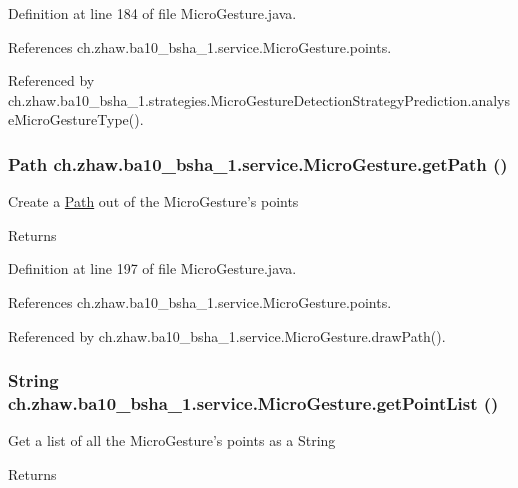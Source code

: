 Definition at line 184 of file MicroGesture.java.

References ch.zhaw.ba10\_\-bsha\_\-1.service.MicroGesture.points.

Referenced by ch.zhaw.ba10\_\-bsha\_\-1.strategies.MicroGestureDetectionStrategyPrediction.analyseMicroGestureType().\hypertarget{classch_1_1zhaw_1_1ba10__bsha__1_1_1service_1_1MicroGesture_a9640a018716e9a2ff309360071af6be7}{
\subsubsection[{getPath}]{\setlength{\rightskip}{0pt plus 5cm}Path ch.zhaw.ba10\_\-bsha\_\-1.service.MicroGesture.getPath ()}}
\label{classch_1_1zhaw_1_1ba10__bsha__1_1_1service_1_1MicroGesture_a9640a018716e9a2ff309360071af6be7}
Create a \hyperlink{}{Path} out of the MicroGesture's points

\begin{DoxyReturn}{Returns}

\end{DoxyReturn}


Definition at line 197 of file MicroGesture.java.

References ch.zhaw.ba10\_\-bsha\_\-1.service.MicroGesture.points.

Referenced by ch.zhaw.ba10\_\-bsha\_\-1.service.MicroGesture.drawPath().\hypertarget{classch_1_1zhaw_1_1ba10__bsha__1_1_1service_1_1MicroGesture_a541771c10aeb3dcabe1d310a26ef1c2b}{
\subsubsection[{getPointList}]{\setlength{\rightskip}{0pt plus 5cm}String ch.zhaw.ba10\_\-bsha\_\-1.service.MicroGesture.getPointList ()}}
\label{classch_1_1zhaw_1_1ba10__bsha__1_1_1service_1_1MicroGesture_a541771c10aeb3dcabe1d310a26ef1c2b}
Get a list of all the MicroGesture's points as a String

\begin{DoxyReturn}{Returns}

\end{DoxyReturn}


